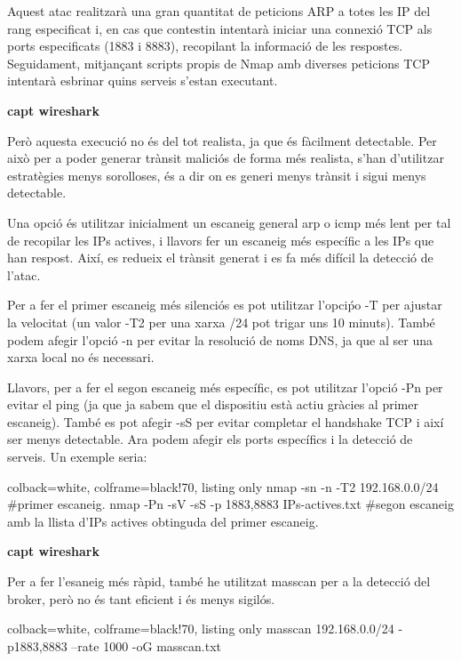 Aquest atac realitzarà una gran quantitat de peticions ARP a totes les IP del rang especificat i, en cas que contestin intentarà iniciar una connexió TCP als ports especificats (1883 i 8883), recopilant la informació de les respostes. Seguidament, mitjançant scripts propis de Nmap amb diverses peticions TCP intentarà esbrinar quins serveis s'estan executant.  

\textbf{capt wireshark}

Però aquesta execució no és del tot realista, ja que és fàcilment detectable. Per això per a poder generar trànsit maliciós de forma més realista, s'han d'utilitzar estratègies menys sorolloses, és a dir on es generi menys trànsit i sigui menys detectable.

Una opció és utilitzar inicialment un escaneig general arp o icmp més lent per tal de recopilar les IPs actives, i llavors fer un escaneig més específic a les IPs que han respost. Així, es redueix el trànsit generat i es fa més difícil la detecció de l'atac.

Per a fer el primer escaneig més silenciós es pot utilitzar l'opciṕo -T per ajustar la velocitat (un valor -T2 per una xarxa /24 pot trigar uns 10 minuts). També podem afegir l'opció -n per evitar la resolució de noms DNS, ja que al ser una xarxa local no és necessari. 

Llavors, per a fer el segon escaneig més específic, es pot utilitzar l'opció -Pn per evitar el ping (ja que ja sabem que el dispositiu està actiu gràcies al primer escaneig). També es pot afegir -sS per evitar completar el handshake TCP i així ser menys detectable. Ara podem afegir els ports específics i la detecció de serveis. Un exemple seria: 
\begin{tcblisting}{colback=white, colframe=black!70, listing only}
    nmap -sn -n -T2 192.168.0.0/24   #primer escaneig.
    nmap -Pn -sV -sS -p 1883,8883 IPs-actives.txt  #segon escaneig amb la llista d'IPs actives obtinguda del primer escaneig.
\end{tcblisting}

\textbf{capt wireshark}

Per a fer l'esaneig més ràpid, també he utilitzat masscan per a la detecció del broker, però no és tant eficient i és menys sigilós.

\begin{tcblisting}{colback=white, colframe=black!70, listing only}
    masscan 192.168.0.0/24 -p1883,8883 --rate 1000 -oG masscan.txt
\end{tcblisting}

